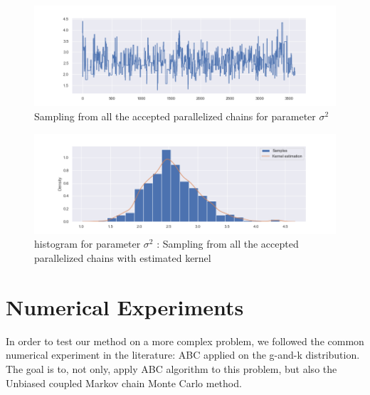 \documentclass {article}
\begin{document}
\begin{figure}[h!]
	\centering
	\includegraphics[width=\textwidth]{doublecoupling_pack/doublecoupling_sampling_sigma}
	\caption{Sampling from all the accepted parallelized chains for parameter $\sigma^2$  }   %
	\label{sigmaallsampledouble}
\end{figure}



\begin{figure}[h!]
	\centering
	\includegraphics[width=\textwidth]{doublecoupling_pack/doublecoupling_sigma_histogram_kernel}
	\caption{histogram for parameter $\sigma^2$ : Sampling from all the accepted parallelized chains with estimated kernel}   %
	\label{sigmahistdouble}
\end{figure}


















	\section{Numerical Experiments}
In order to test our method on a more complex problem, we followed the common numerical experiment in the literature: ABC applied on the g-and-k distribution.
The goal is to, not only, apply ABC algorithm to this problem, but also the Unbiased coupled Markov chain Monte Carlo method.
\end{document}
